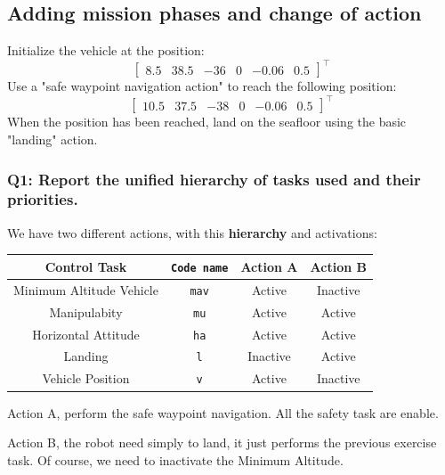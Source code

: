 \documentclass{article}
\begin{document}
\subsection{Adding mission phases and change of action}
Initialize the vehicle at the position:
\begin{displaymath}
\begin{bmatrix} 8.5 & 38.5 & -36 & 0 & -0.06 & 0.5 \end{bmatrix}^\top
\end{displaymath} 
Use a "safe waypoint navigation action" to reach the following position: 
\begin{displaymath}
\begin{bmatrix} 10.5 & 37.5 & -38 & 0 & -0.06 & 0.5 \end{bmatrix}^\top
\end{displaymath} 
When the position has been reached, land on the seafloor using the basic "landing" action.

\subsubsection{Q1: Report the unified hierarchy of tasks used and their priorities.}

We have two different actions, with this \textbf{hierarchy} and activations: 
\begin{center}
\begin{tabular}{ | c | c | c | c |}
\hline
 Control Task & \texttt{Code name} & Action A & Action B \\
\hline
 Minimum Altitude Vehicle &  \texttt{mav} & Active & Inactive  \\  
 Manipulabity &  \texttt{mu} & Active & Active  \\
 Horizontal Attitude &  \texttt{ha} & Active & Active \\
 Landing & \texttt{l} &Inactive & Active \\
 Vehicle Position &  \texttt{v} &Active & Inactive \\
 \hline
\end{tabular}
\end{center}

\begin{description}
\item Action A, perform the safe waypoint navigation. All the safety task are enable. 
\item Action B, the robot need simply to land, it just performs the previous exercise task. Of course, we need to inactivate the Minimum Altitude.
\end{description}
 
\end{document}
